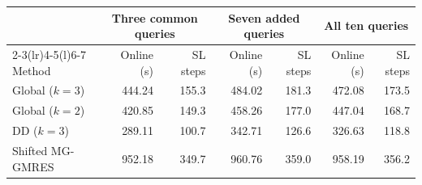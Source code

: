 \begin{tabular*}{\linewidth}{@{\extracolsep{\fill}}lrrrrrr@{}}\toprule
& \multicolumn{2}{c}{Three common queries} & \multicolumn{2}{c}{Seven added queries} & \multicolumn{2}{c}{All ten queries} \\
\cmidrule(lr){2-3}\cmidrule(lr){4-5}\cmidrule(l){6-7}
Method & Online (s) & SL steps & Online (s) & SL steps & Online (s) & SL steps \\
\midrule
Global (\(k=3\)) & 444.24 & 155.3 & 484.02 & 181.3 & 472.08 & 173.5 \\
Global (\(k=2\)) & 420.85 & 149.3 & 458.26 & 177.0 & 447.04 & 168.7 \\
DD (\(k=3\)) & 289.11 & 100.7 & 342.71 & 126.6 & 326.63 & 118.8 \\
Shifted MG-GMRES & 952.18 & 349.7 & 960.76 & 359.0 & 958.19 & 356.2 \\
\bottomrule\end{tabular*}
